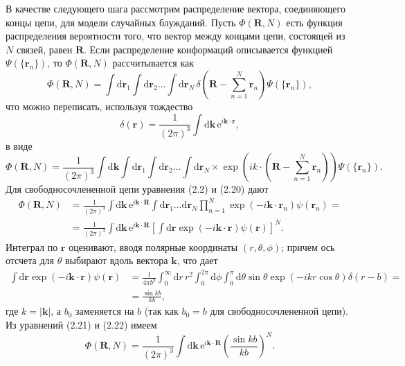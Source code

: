 \documentclass[12pt,a4paper]{article}
\begin{document}
В качестве следующего шага рассмотрим распределение вектора, соединяющего концы цепи, для модели случайных блужданий. Пусть $\Phi(\boldsymbol{R}, N)$ есть функция распределения вероятности того, что вектор между концами цепи, состоящей из $N$ связей, равен $\boldsymbol{R}$. Если распределение конформаций описывается функцией $\Psi(\{\boldsymbol{r}_n\})$, то $\Phi(\boldsymbol{R}, N)$ рассчитывается как
\begin{equation}
\Phi(\boldsymbol{R}, N) = \int\!\mathrm{d}\boldsymbol{r}_1\int\!\mathrm{d}\boldsymbol{r}_2 \dots \int\!\mathrm{d}\boldsymbol{r}_N \, \delta\left(\boldsymbol{R} - \sum_{n=1}^N \boldsymbol{r}_n\right)\Psi(\{\boldsymbol{r}_n\}), \tag{2.18}
\end{equation}
что можно переписать, используя тождество
\begin{equation}
\delta(\boldsymbol{r}) = \frac{1}{(2\pi)^3}\int\!\mathrm{d}\boldsymbol{k}\,\mathrm{e}^{i\boldsymbol{k}\cdot\boldsymbol{r}}, \tag{2.19}
\end{equation}
в виде
\begin{equation}
\Phi(\boldsymbol{R}, N) = \frac{1}{(2\pi)^3}\int\!\mathrm{d}\boldsymbol{k}\int\!\mathrm{d}\boldsymbol{r}_1\int\!\mathrm{d}\boldsymbol{r}_2 \dots \int\!\mathrm{d}\boldsymbol{r}_N \times \exp\left(ik\cdot\left(\boldsymbol{R} - \sum_{n=1}^N \boldsymbol{r}_n\right)\right)\Psi(\{\boldsymbol{r}_n\}). \tag{2.20}
\end{equation}
Для свободносочлененной цепи уравнения (2.2) и (2.20) дают
\begin{align}
\Phi(\boldsymbol{R}, N) &= \frac{1}{(2\pi)^3}\int\!\mathrm{d}\boldsymbol{k}\,\mathrm{e}^{i\boldsymbol{k}\cdot\boldsymbol{R}}\int\!\mathrm{d}\boldsymbol{r}_1 \dots \mathrm{d}\boldsymbol{r}_N \prod_{n=1}^N \exp(-i\boldsymbol{k}\cdot\boldsymbol{r}_n)\psi(\boldsymbol{r}_n) = \nonumber\\
&= \frac{1}{(2\pi)^3}\int\!\mathrm{d}\boldsymbol{k}\,\mathrm{e}^{i\boldsymbol{k}\cdot\boldsymbol{R}}\left[\int\!\mathrm{d}\boldsymbol{r}\exp(-i\boldsymbol{k}\cdot\boldsymbol{r})\psi(\boldsymbol{r})\right]^N. \tag{2.21}
\end{align}
Интеграл по $\boldsymbol{r}$ оценивают, вводя полярные координаты $(r, \theta, \phi)$; причем ось отсчета для $\theta$ выбирают вдоль вектора $\boldsymbol{k}$, что дает
\begin{align}
\int\!\mathrm{d}\boldsymbol{r}\exp(-i\boldsymbol{k}\cdot\boldsymbol{r})\psi(\boldsymbol{r}) &= \frac{1}{4\pi b^2}\int_0^\infty\!\mathrm{d}r\,r^2\int_0^{2\pi}\!\mathrm{d}\phi\int_0^\pi\!\mathrm{d}\theta\sin\theta\exp(-ikr\cos\theta)\delta(r-b) = \nonumber\\
&= \frac{\sin kb}{kb}, \tag{2.22}
\end{align}
где $k = |\boldsymbol{k}|$, а $b_0$ заменяется на $b$ (так как $b_0 = b$ для свободносочлененной цепи). Из уравнений (2.21) и (2.22) имеем
\begin{equation}
\Phi(\boldsymbol{R}, N) = \frac{1}{(2\pi)^3}\int\!\mathrm{d}\boldsymbol{k}\,\mathrm{e}^{i\boldsymbol{k}\cdot\boldsymbol{R}}\left(\frac{\sin kb}{kb}\right)^N. \tag{2.23}
\end{equation}
\end{document}
